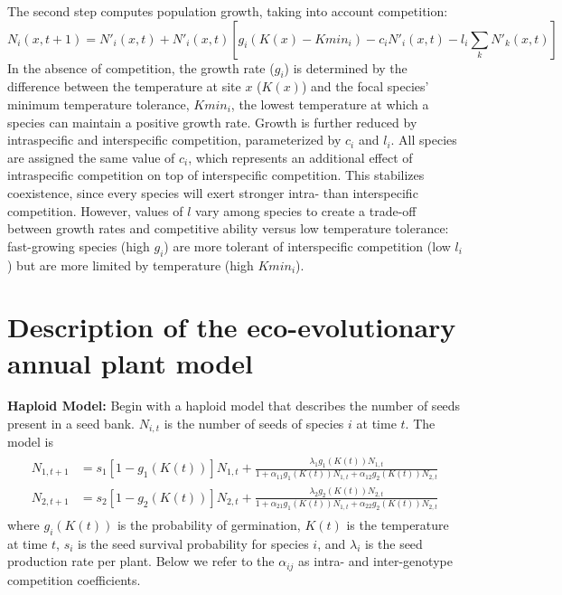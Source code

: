 \documentclass[11pt]{article}
\begin{document}
The second step computes population growth, taking into account competition:
\begin{equation}
N_{i}(x,t+1) = N'_{i}(x,t) + N'_{i}(x,t)[g_i(K(x) - Kmin_i) - c_i N'_{i}(x,t) - l_i \sum_{k} N'_{k}(x,t)]
\end{equation}
In the absence of competition, the growth rate ($g_i$) is determined by the difference between the temperature at site $x$ ($K(x)$) and the focal species' minimum temperature tolerance, $Kmin_i$, the lowest temperature at which a species can maintain a positive growth rate. Growth is further reduced by intraspecific and interspecific competition, parameterized by $c_i$ and $l_i$.  All species are assigned the same value of $c_i$, which represents an additional effect of intraspecific competition on top of interspecific competition. This stabilizes coexistence, since every species will exert stronger intra- than interspecific competition. However, values of $l$ vary among species to create a trade-off between growth rates and competitive ability versus low temperature tolerance: fast-growing species (high $g_i$) are more tolerant of interspecific competition (low $l_i$) but are more limited by temperature (high $Kmin_i$).

\section{Description of the eco-evolutionary annual plant model}\label{eco-evo}


\noindent \textbf{Haploid Model:} Begin with a haploid model that describes the number of seeds present in a seed bank.  $N_{i,t}$ is the number of seeds of species $i$ at time $t$.  The model is
\begin{align}\begin{split}
N_{1,t+1} &= s_1 [1-g_1(K(t))]N_{1,t}+\frac{\lambda_1g_1(K(t))N_{1,t}}{1+ \alpha_{11}g_1(K(t))N_{1,t} + \alpha_{12}g_2(K(t))N_{2,t}}\\
N_{2,t+1} &= s_2 [1-g_2(K(t))]N_{2,t}+\frac{\lambda_2g_2(K(t))N_{2,t}}{1+ \alpha_{21}g_1(K(t))N_{1,t} + \alpha_{22}g_2(K(t))N_{2,t}}
\end{split}\end{align}
where $g_{i}(K(t))$ is the probability of germination, $K(t)$ is the temperature at time $t$, $s_i$ is the seed survival probability for species $i$, and $\lambda_i$ is the seed production rate per plant.  Below we refer to the $\alpha_{ij}$ as intra- and inter-genotype competition coefficients.  
\end{document}
